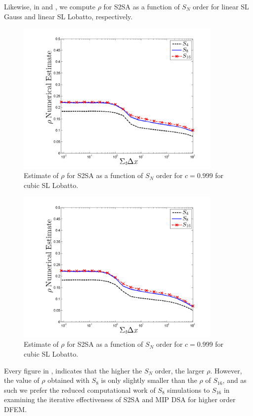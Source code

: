 %
%
Likewise, in  and , we compute $\rho$ for S2SA as a function of $S_N$ order for linear SL Gauss and linear SL Lobatto, respectively.
\begin{figure}[!htp]
\centering
\includegraphics[width=10cm]{chapter4_acceleration/Constant_XS_sn_comparions_S2SA_Gauss.png}
\caption{Estimate of $\rho$ for S2SA as a function of $S_N$ order for $c=0.999$ for  cubic SL Lobatto.}
\label{fig:s2sa_gauss_as_fun_sn}
\end{figure}
%
%
\begin{figure}[!hbp]
\centering
\includegraphics[width=10cm]{chapter4_acceleration/Constant_XS_sn_comparions_S2SA_Lobatto.png}
\caption{Estimate of $\rho$ for S2SA as a function of $S_N$ order for $c=0.999$ for  cubic SL Lobatto.}
\label{fig:s2sa_lobatto_as_fun_sn}
\end{figure}
Every figure in , indicates that the higher the $S_N$ order, the larger $\rho$. 
However, the value of $\rho$ obtained with $S_8$ is only slightly smaller than the $\rho$ of $S_{16}$, and as such we prefer the reduced computational work of $S_8$ simulations to $S_{16}$ in examining the iterative effectiveness of S2SA and MIP DSA for higher order DFEM.

